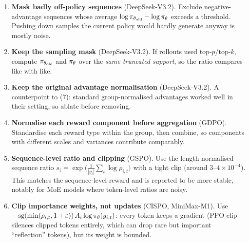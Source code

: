 \begin{enumerate}
\item \textbf{Mask badly off-policy sequences} (DeepSeek-V3.2). Exclude negative-advantage
sequences whose average $\log\pi_{\theta_{\text{old}}}-\log\pi_\theta$ exceeds a threshold. Pushing down
samples the current policy would hardly generate anyway is mostly noise.
\item \textbf{Keep the sampling mask} (DeepSeek-V3.2). If rollouts used top-$p$/top-$k$,
compute $\pi_{\theta_{\text{old}}}$ and $\pi_\theta$ over the \emph{same truncated support}, so the ratio compares
like with like.
\item \textbf{Keep the original advantage normalisation} (DeepSeek-V3.2). A counterpoint to
(7): standard group-normalised advantages worked well in their setting, so ablate before
removing.
\item \textbf{Normalise each reward component before aggregation} (GDPO). Standardise each
reward type within the group, then combine, so components with different scales and variances
contribute comparably.
\item \textbf{Sequence-level ratio and clipping} (GSPO). Use the length-normalised sequence
ratio $s_i=\exp\big(\frac1{|y_i|}\sum_t\log\rho_{i,t}\big)$ with a tight clip (around
$3$--$4\times10^{-4}$). This matches the sequence-level reward and is reported to be more
stable, notably for MoE models where token-level ratios are noisy.
\item \textbf{Clip importance weights, not updates} (CISPO, MiniMax-M1). Use
$-\operatorname{sg}(\min(\rho_{i,t},1+\varepsilon))\,A_i\log\pi_\theta(y_{i,t})$: every token
keeps a gradient (PPO-clip silences clipped tokens entirely, which can drop rare but
important ``reflection'' tokens), but its weight is bounded.
\end{enumerate}

